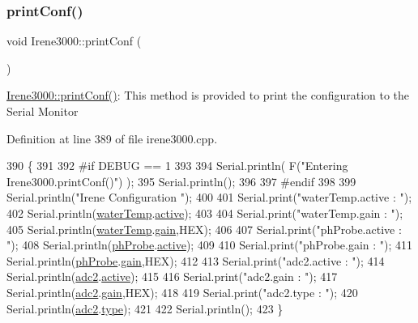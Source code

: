 \subsubsection{\texorpdfstring{print\+Conf()}{printConf()}}
{\footnotesize\ttfamily void Irene3000\+::print\+Conf (\begin{DoxyParamCaption}{ }\end{DoxyParamCaption})}

\hyperlink{class_irene3000_a7bc2414100b5e19eacc6630fa34b2654}{Irene3000\+::print\+Conf()}\+: This method is provided to print the configuration to the Serial Monitor 

Definition at line 389 of file irene3000.\+cpp.


\begin{DoxyCode}
390 \{
391 
392 \textcolor{preprocessor}{#if DEBUG == 1 }
393 
394     Serial.println( F(\textcolor{stringliteral}{"Entering Irene3000.printConf()"}) );
395     Serial.println();
396 
397 \textcolor{preprocessor}{#endif }
398 
399     Serial.println(\textcolor{stringliteral}{"Irene Configuration "});
400 
401     Serial.print(\textcolor{stringliteral}{"waterTemp.active : "});
402     Serial.println(\hyperlink{class_irene3000_af05612c78c758ce9db316c75ad937130}{waterTemp}.\hyperlink{struct_irene3000_1_1state_a879828ace7e7a7bc91ff703bfee36599}{active});
403 
404     Serial.print(\textcolor{stringliteral}{"waterTemp.gain : "});
405     Serial.println(\hyperlink{class_irene3000_af05612c78c758ce9db316c75ad937130}{waterTemp}.\hyperlink{struct_irene3000_1_1state_a1ecf69d38cb31ecaf6b3602a3f3e93cb}{gain},HEX);    
406 
407     Serial.print(\textcolor{stringliteral}{"phProbe.active : "});
408     Serial.println(\hyperlink{class_irene3000_a997a4ee466fa1d5416e07e444965dc9e}{phProbe}.\hyperlink{struct_irene3000_1_1state_a879828ace7e7a7bc91ff703bfee36599}{active});
409 
410     Serial.print(\textcolor{stringliteral}{"phProbe.gain : "});
411     Serial.println(\hyperlink{class_irene3000_a997a4ee466fa1d5416e07e444965dc9e}{phProbe}.\hyperlink{struct_irene3000_1_1state_a1ecf69d38cb31ecaf6b3602a3f3e93cb}{gain},HEX);
412     
413     Serial.print(\textcolor{stringliteral}{"adc2.active : "});
414     Serial.println(\hyperlink{class_irene3000_aae3a95a1c83c766cd2f299ce471c337e}{adc2}.\hyperlink{struct_irene3000_1_1state_a879828ace7e7a7bc91ff703bfee36599}{active});
415 
416     Serial.print(\textcolor{stringliteral}{"adc2.gain : "});
417     Serial.println(\hyperlink{class_irene3000_aae3a95a1c83c766cd2f299ce471c337e}{adc2}.\hyperlink{struct_irene3000_1_1state_a1ecf69d38cb31ecaf6b3602a3f3e93cb}{gain},HEX);
418 
419     Serial.print(\textcolor{stringliteral}{"adc2.type : "});
420     Serial.println(\hyperlink{class_irene3000_aae3a95a1c83c766cd2f299ce471c337e}{adc2}.\hyperlink{struct_irene3000_1_1state_a9897a7e02727db6351d44006eec73799}{type});
421 
422     Serial.println();
423 \}
\end{DoxyCode}
